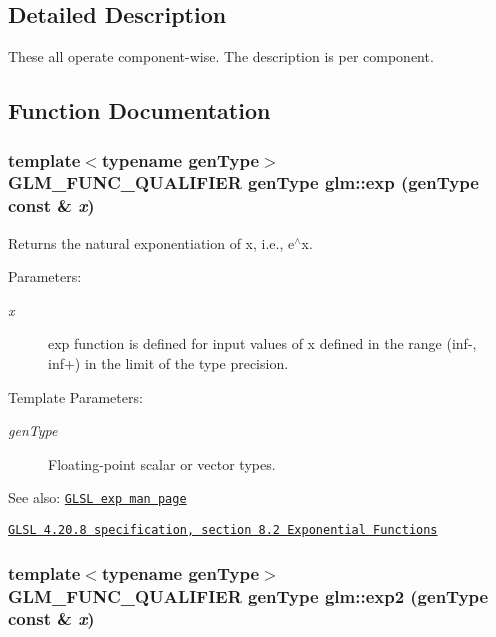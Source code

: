 \subsection{Detailed Description}
These all operate component-wise. The description is per component. 

\subsection{Function Documentation}
\hypertarget{group__core__func__exponential_g0e7e69c5497cbbfe4afe08ee5449c553}{
\subsubsection[exp]{\setlength{\rightskip}{0pt plus 5cm}template$<$typename genType$>$ GLM\_\-FUNC\_\-QUALIFIER genType glm::exp (genType const \& {\em x})}}
\label{group__core__func__exponential_g0e7e69c5497cbbfe4afe08ee5449c553}


Returns the natural exponentiation of x, i.e., e$^\wedge$x.

\begin{Desc}
\item[Parameters:]
\begin{description}
\item[{\em x}]exp function is defined for input values of x defined in the range (inf-, inf+) in the limit of the type precision. \end{description}
\end{Desc}
\begin{Desc}
\item[Template Parameters:]
\begin{description}
\item[{\em genType}]Floating-point scalar or vector types.\end{description}
\end{Desc}
\begin{Desc}
\item[See also:]\href{http://www.opengl.org/sdk/docs/manglsl/xhtml/exp.xml}{\tt GLSL exp man page} 

\href{http://www.opengl.org/registry/doc/GLSLangSpec.4.20.8.pdf}{\tt GLSL 4.20.8 specification, section 8.2 Exponential Functions} \end{Desc}
\hypertarget{group__core__func__exponential_g85f6efedaa47799e8f406481baca2171}{
\subsubsection[exp2]{\setlength{\rightskip}{0pt plus 5cm}template$<$typename genType$>$ GLM\_\-FUNC\_\-QUALIFIER genType glm::exp2 (genType const \& {\em x})}}
\label{group__core__func__exponential_g85f6efedaa47799e8f406481baca2171}


